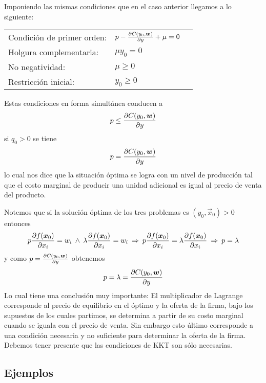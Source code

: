 Imponiendo las mismas condiciones que en el caso anterior llegamos a lo siguiente:

\begin{center}
\begin{tabular}{llr}
Condici\'on de primer orden: & $p - \frac{\partial C(y_0,\boldsymbol{w})}{\partial y} + \mu = 0$ \\
Holgura complementaria: & $\mu y_0 = 0$ \\
No negatividad: & $\mu \geq 0$  \\
Restricci\'on inicial: & $y_0 \geq 0$
\end{tabular}
\end{center}

Estas condiciones en forma simult\'anea conducen a 
$$p\leq \frac{\partial C(y_0,\boldsymbol{w})}{\partial y}$$
si $q_0>0$ se tiene
$$p=\frac{\partial C(y_0,\boldsymbol{w})}{\partial y}$$
lo cual nos dice que la situaci\'on \'optima se logra con un nivel de producci\'on tal que el costo marginal de producir una unidad adicional es igual al precio de venta del producto.

Notemos que si la soluci\'on \'optima de los tres problemas es $(y_0,\vec{x}_0)>0$ entonces
$$p\frac{\partial f(\boldsymbol{x}_{0})}{\partial x_i}= w_i \:\wedge\: \lambda \frac{\partial f(\boldsymbol{x}_{0})}{\partial x_i}= w_i \:\Rightarrow\: p\frac{\partial f(\boldsymbol{x}_{0})}{\partial x_i}=\lambda \frac{\partial f(\boldsymbol{x}_{0})}{\partial x_i} \:\Rightarrow\: p=\lambda$$
y como $p=\frac{\partial C(y_0,\boldsymbol{w})}{\partial y}$ obtenemos
$$p=\lambda=\frac{\partial C(y_0,\boldsymbol{w})}{\partial y}$$
Lo cual tiene una conclusi\'on muy importante: El multiplicador de Lagrange corresponde al precio de equilibrio en el \'optimo y la oferta de la firma, bajo los supuestos de los cuales partimos, se determina a partir de su costo marginal cuando se iguala con el precio de venta. Sin embargo esto \'ultimo corresponde a una condici\'on necesaria y no suficiente para determinar la oferta de la firma. Debemos tener presente que las condiciones de KKT son s\'olo necesarias.

\subsection{Ejemplos}

